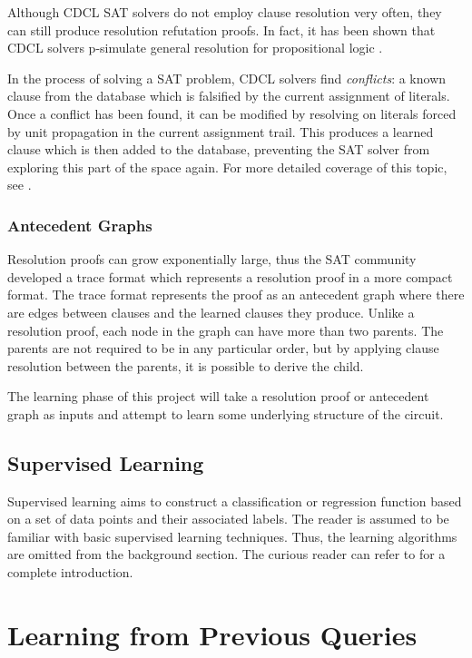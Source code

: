 \documentclass[letterpaper]{article} %
\begin{document}
Although CDCL SAT solvers do not employ clause resolution very often, they can still produce resolution refutation proofs. In fact, it has been shown that CDCL solvers p-simulate general resolution for propositional logic \cite{cdclres}.

In the process of solving a SAT problem, CDCL solvers find \textit{conflicts}: a known clause from the database which is falsified by the current assignment of literals. Once a conflict has been found, it can be modified by resolving on literals forced by unit propagation in the current assignment trail. This produces a learned clause which is then added to the database, preventing the SAT solver from exploring this part of the space again. For more detailed coverage of this topic, see \cite{satres}.

\subsubsection{Antecedent Graphs}

Resolution proofs can grow exponentially large, thus the SAT community developed a trace format which represents a resolution proof in a more compact format. The trace format represents the proof as an antecedent graph where there are edges between clauses and the learned clauses they produce. Unlike a resolution proof, each node in the graph can have more than two parents. The parents are not required to be in any particular order, but by applying clause resolution between the parents, it is possible to derive the child.

The learning phase of this project will take a resolution proof or antecedent graph as inputs and attempt to learn some underlying structure of the circuit.

\subsection{Supervised Learning}
Supervised learning aims to construct a classification or regression function based on a set of data points and their associated labels. The reader is assumed to be familiar with basic supervised learning techniques. Thus, the learning algorithms are omitted from the background section. The curious reader can refer to \cite{Murphy} for a complete introduction.

\section{Learning from Previous Queries}
\end{document}
